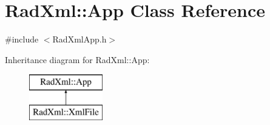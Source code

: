 \hypertarget{class_rad_xml_1_1_app}{\section{Rad\-Xml\-:\-:App Class Reference}
\label{class_rad_xml_1_1_app}
}


{\ttfamily \#include $<$Rad\-Xml\-App.\-h$>$}

Inheritance diagram for Rad\-Xml\-:\-:App\-:\begin{figure}[H]
\begin{center}
\leavevmode
\includegraphics[height=2.000000cm]{class_rad_xml_1_1_app}
\end{center}
\end{figure}
